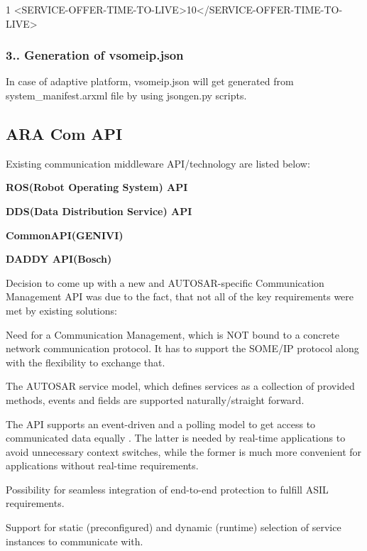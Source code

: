 \begin{DoxyCode}
1 <\textcolor{keywordtype}{SERVICE-OFFER-TIME-TO-LIVE}>10</\textcolor{keywordtype}{SERVICE-OFFER-TIME-TO-LIVE}>
\end{DoxyCode}
 \subsubsection*{3.. Generation of vsomeip.\+json}


\begin{DoxyItemize}
\item In case of adaptive platform, vsomeip.\+json will get generated from system\+\_\+manifest.\+arxml file by using jsongen.\+py scripts.
\end{DoxyItemize}

\hypertarget{adaptive_communicationmanagement_aracom}{}\subsection{A\+RA Com A\+PI}\label{adaptive_communicationmanagement_aracom}

\begin{DoxyItemize}
\item Existing communication middleware A\+P\+I/technology are listed below\+:
\begin{DoxyItemize}
\item {\bfseries R\+O\+S(\+Robot Operating System) A\+PI}
\item {\bfseries D\+D\+S(\+Data Distribution Service) A\+PI}
\item {\bfseries Common\+A\+P\+I(\+G\+E\+N\+I\+V\+I)}
\item {\bfseries D\+A\+D\+DY A\+P\+I(\+Bosch)}
\end{DoxyItemize}
\item Decision to come up with a new and A\+U\+T\+O\+S\+A\+R-\/specific Communication Management A\+PI was due to the fact, that not all of the key requirements were met by existing solutions\+:
\begin{DoxyItemize}
\item Need for a Communication Management, which is N\+OT bound to a concrete network communication protocol. It has to support the S\+O\+M\+E/\+IP protocol along with the flexibility to exchange that.
\item The A\+U\+T\+O\+S\+AR service model, which defines services as a collection of provided methods, events and fields are supported naturally/straight forward.
\item The A\+PI supports an event-\/driven and a polling model to get access to communicated data equally . The latter is needed by real-\/time applications to avoid unnecessary context switches, while the former is much more convenient for applications without real-\/time requirements.
\item Possibility for seamless integration of end-\/to-\/end protection to fulfill A\+S\+IL requirements.
\item Support for static (preconfigured) and dynamic (runtime) selection of service instances to communicate with.
\end{DoxyItemize}
\end{DoxyItemize}

